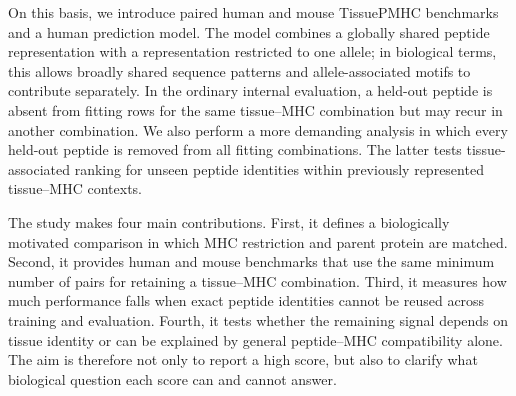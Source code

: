 On this basis, we introduce paired human and mouse TissuePMHC benchmarks and a human prediction model. The model combines a globally shared peptide representation with a representation restricted to one \plainHLA{} allele; in biological terms, this allows broadly shared sequence patterns and allele-associated motifs to contribute separately. In the ordinary internal evaluation, a held-out peptide is absent from fitting rows for the same tissue--MHC combination but may recur in another combination. We also perform a more demanding analysis in which every held-out peptide is removed from all fitting combinations. The latter tests tissue-associated ranking for unseen peptide identities within previously represented tissue--MHC contexts.

The study makes four main contributions. First, it defines a biologically motivated comparison in which MHC restriction and parent protein are matched. Second, it provides human and mouse benchmarks that use the same minimum number of pairs for retaining a tissue--MHC combination. Third, it measures how much performance falls when exact peptide identities cannot be reused across training and evaluation. Fourth, it tests whether the remaining signal depends on tissue identity or can be explained by general peptide--MHC compatibility alone. The aim is therefore not only to report a high score, but also to clarify what biological question each score can and cannot answer.
